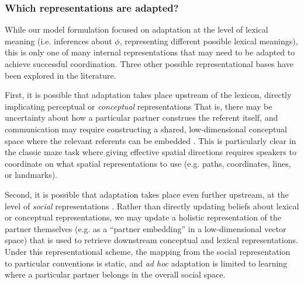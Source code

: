 
%

\subsubsection{Which representations are adapted?}

While our model formulation focused on adaptation at the level of lexical meaning (i.e. inferences about $\phi$, representing different possible lexical meanings), this is only one of many internal representations that may need to be adapted to achieve successful coordination. 
Three other possible representational bases have been explored in the literature. 

First, it is possible that adaptation takes place upstream of the lexicon, directly implicating perceptual or \emph{conceptual} representations \cite{GarrodAnderson87_SayingWhatYouMean,HealeySwobodaUmataKing07_GraphicalLanguageGames}
That is, there may be uncertainty about how a particular partner construes the referent itself, and communication may require constructing a shared, low-dimensional conceptual space where the relevant referents can be embedded \cite{stolk2016conceptual}.
This is particularly clear in the classic maze task \cite{GarrodAnderson87_SayingWhatYouMean} where giving effective spatial directions requires speakers to coordinate on what spatial representations to use (e.g. paths, coordinates, lines, or landmarks). 

Second, it is possible that adaptation takes place even further upstream, at the level of \emph{social} representations \cite{jaech2018low}.
Rather than directly updating beliefs about lexical or conceptual representations, we may update a holistic representation of the partner themselves (e.g. as a ``partner embedding'' in a low-dimensional vector space) that is used to retrieve downstream conceptual and lexical representations. 
Under this representational scheme, the mapping from the social representation to particular conventions is static, and \emph{ad hoc} adaptation is limited to learning where a particular partner belongs in the overall social space.

